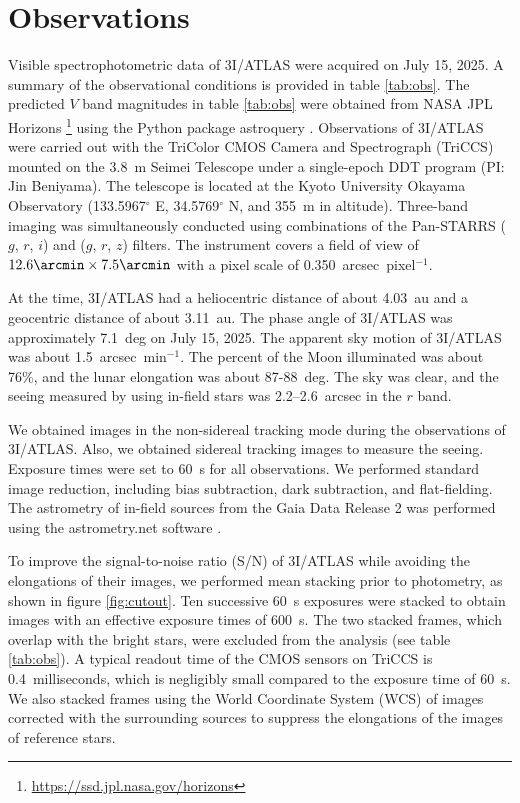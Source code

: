 \documentclass[]{pasj02}
\newcommand\I{3I/ATLAS\xspace}
\begin{document}
\section{Observations}\label{sec:obs}
Visible spectrophotometric data of \I were acquired on July 15, 2025.
A summary of the observational conditions is provided in table \ref{tab:obs}.
The predicted $V$ band magnitudes in table \ref{tab:obs} were obtained from NASA JPL Horizons \footnote{\url{https://ssd.jpl.nasa.gov/horizons}} using the Python package astroquery \citep{Ginsburg2019}.
Observations of \I were carried out with the TriColor CMOS Camera and Spectrograph (TriCCS) mounted on the 3.8~m Seimei Telescope \citep{Kurita2020} 
under a single-epoch DDT program (PI: Jin Beniyama).
The telescope is located at the Kyoto University Okayama Observatory (133.5967$^\circ$ E, 34.5769$^\circ$ N, and 355~m in altitude).
Three-band imaging was simultaneously conducted using combinations of the Pan-STARRS ($g$, $r$, $i$) and ($g$, $r$, $z$) filters.
The instrument covers a field of view of $12.6\arcmin \times 7.5\arcmin$ with a pixel scale of 0.350~arcsec~pixel$^{-1}$.

At the time, \I had a heliocentric distance of about 4.03~au and a geocentric distance of about 3.11~au.
The phase angle of \I was approximately 7.1~deg on July 15, 2025.
The apparent sky motion of \I was about 1.5~arcsec~min$^{-1}$.
The percent of the Moon illuminated was about 76\%, and the lunar elongation was about 87-88~deg.
The sky was clear, and the seeing measured by using in-field stars was 2.2--2.6~arcsec in the $r$ band.

We obtained images in the non-sidereal tracking mode during the observations of \I.
Also, we obtained sidereal tracking images to measure the seeing.
Exposure times were set to 60~s for all observations.
We performed standard image reduction, including bias subtraction, dark subtraction, and flat-fielding.
The astrometry of in-field sources from the Gaia Data Release 2 was performed using the astrometry.net software \citep{Lang2010}.

To improve the signal-to-noise ratio (S/N) of \I while avoiding the elongations of their images, we performed mean stacking prior to photometry, as shown in figure \ref{fig:cutout}.
Ten successive 60~s exposures were stacked to obtain images with an effective exposure times of 600~s.
The two stacked frames, which overlap with the bright stars, were excluded from the analysis (see table \ref{tab:obs}).
A typical readout time of the CMOS sensors on TriCCS is 0.4~milliseconds,
which is negligibly small compared to the exposure time of 60~s.
We also stacked frames using the World Coordinate System (WCS) of images corrected with the surrounding sources to suppress the elongations of the images of reference stars.
\end{document}

